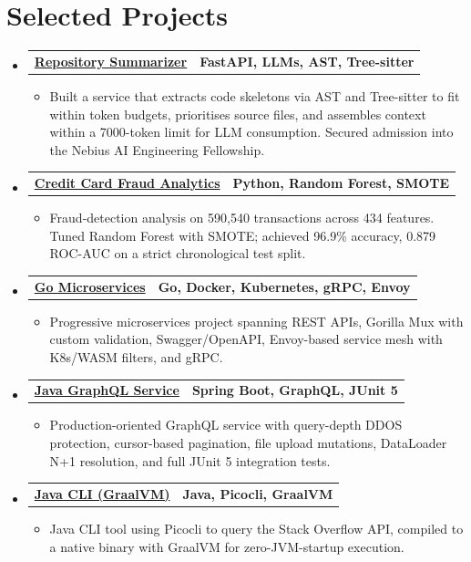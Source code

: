 \documentclass[letterpaper,11pt]{article}
\makeatletter
\newcommand{\resumeItem}[1]{
  \item\small{
    {#1 \vspace{-3pt}}
  }
}
\newcommand{\resumeProjectHeading}[2]{
  \vspace{-3pt}\item
    \begin{tabular*}{1.0\textwidth}[t]{l@{\extracolsep{\fill}}r}
      \textbf{#1} & \textbf{\small #2} \\
    \end{tabular*}\vspace{-7pt}
}
\newcommand{\resumeSubHeadingListStart}{\begin{itemize}[leftmargin=0.0in, label={}]}
\newcommand{\resumeSubHeadingListEnd}{\end{itemize}}
\newcommand{\resumeItemListStart}{\begin{itemize}}
\newcommand{\resumeItemListEnd}{\end{itemize}\vspace{0pt}}
\makeatother
\begin{document}
\section{Selected Projects}
\resumeSubHeadingListStart
    \resumeProjectHeading
        {\href{https://github.com/aymanapatel/nebius-project}{\textbf{Repository Summarizer}}}{FastAPI, LLMs, AST, Tree-sitter}
        \resumeItemListStart
            \resumeItem{Built a service that extracts code skeletons via AST and Tree-sitter to fit within token budgets, prioritises source files, and assembles context within a 7000-token limit for LLM consumption. Secured admission into the Nebius AI Engineering Fellowship.}
        \resumeItemListEnd
    \resumeProjectHeading
        {\href{https://github.com/aymanapatel/qmul-all-projects/blob/main/data-analytics/coursework1/credit-card-report.pdf}{\textbf{Credit Card Fraud Analytics}}}{Python, Random Forest, SMOTE}
        \resumeItemListStart
            \resumeItem{Fraud-detection analysis on 590,540 transactions across 434 features. Tuned Random Forest with SMOTE; achieved 96.9\% accuracy, 0.879 ROC-AUC on a strict chronological test split.}
        \resumeItemListEnd
    \resumeProjectHeading
        {\href{https://github.com/aymanapatel/golang-microservices}{\textbf{Go Microservices}}}{Go, Docker, Kubernetes, gRPC, Envoy}
        \resumeItemListStart
            \resumeItem{Progressive microservices project spanning REST APIs, Gorilla Mux with custom validation, Swagger/OpenAPI, Envoy-based service mesh with K8s/WASM filters, and gRPC.}
        \resumeItemListEnd
    \resumeProjectHeading
        {\href{https://github.com/aymanapatel/java-graphql}{\textbf{Java GraphQL Service}}}{Spring Boot, GraphQL, JUnit 5}
        \resumeItemListStart
            \resumeItem{Production-oriented GraphQL service with query-depth DDOS protection, cursor-based pagination, file upload mutations, DataLoader N+1 resolution, and full JUnit 5 integration tests.}
        \resumeItemListEnd
    \resumeProjectHeading
        {\href{https://github.com/aymanapatel/java-cli}{\textbf{Java CLI (GraalVM)}}}{Java, Picocli, GraalVM}
        \resumeItemListStart
            \resumeItem{Java CLI tool using Picocli to query the Stack Overflow API, compiled to a native binary with GraalVM for zero-JVM-startup execution.}
        \resumeItemListEnd
\resumeSubHeadingListEnd

\end{document}
